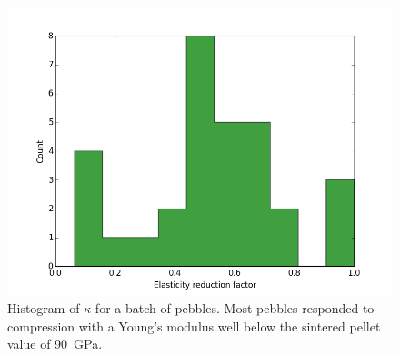 \begin{figure}[!ht]
\centering
    \includegraphics[width=\imagewidth]{chapters/figures/fzk-kappa-histogram.png}
    \caption{Histogram of $\kappa$ for a batch of \lis pebbles. Most pebbles responded to compression with a Young's modulus well below the sintered pellet value of \si{90 GPa}.}
    \label{fig:fzk-kappa-hist}
\end{figure}

